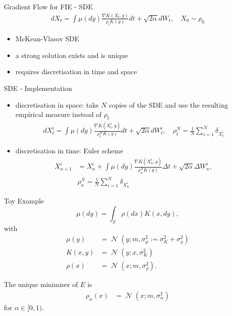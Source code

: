 \documentclass[aspectratio=149]{beamer}
\newcommand{\X}{\ensuremath{\mathbb{X}}}
\DeclareMathOperator{\N}{\mathcal{N}}
\begin{document}
\begin{frame}{Gradient Flow for FIE - SDE}
\begin{align*}
dX_{t}=\int\mu\left(dy\right)\frac{\nabla K(X_{t},y)}{\rho_{t}K(y)}dt+\sqrt{2\alpha}dW_{t},\quad X_{0}\sim\rho_{0}
\end{align*}

\begin{itemize}
\item McKean-Vlasov SDE
\item a strong solution exists and is unique
\item requires discretisation in time and space
\end{itemize}
\end{frame}

\begin{frame}{SDE - Implementation}
\begin{itemize}
\item discretisation in space: take $N$ copies of the SDE and use the resulting empirical measure instead of $\rho_t$
\begin{align*}
dX_{t}^{i}=\int\mu\left(dy\right)\frac{\nabla K(X_{t}^{i},y)}{\rho_{t}^{N}K(y)}dt+\sqrt{2\alpha}dW_{t}^{i},\quad\rho_{t}^{N}=\frac{1}{N}\sum_{i=1}^{N}\delta_{X_{t}^{i}}
\end{align*}
\item discretisation in time: Euler scheme
\begin{align*}
X_{n+1}^{i}& =X_{n}^{i}+\int\mu\left(dy\right)\frac{\nabla K(X_{n}^{i},y)}{\rho_{n}^{N}K(y)}\Delta t+\sqrt{2\alpha}\Delta W^{i}_n,\\
&\rho_{n}^{N}=\frac{1}{N}\sum_{i=1}^{N}\delta_{X_{n}^{i}}
\end{align*}
\end{itemize}
\end{frame}

\begin{frame}{Toy Example}
\begin{equation*}
\mu(dy) = \int_{\X} \rho(dx) K(x, dy), 
\end{equation*}
with 
\begin{align*}
\mu(y)&=\N(y;m,\sigma_{\mu}^{2}:=\sigma_{K}^{2}+\sigma_{\rho}^{2})\\
K(x,y)&=\N(y;x,\sigma_{K}^{2})\\
\rho(x)&=\N(x;m,\sigma_{\rho}^{2}).
\end{align*}

The unique minimiser of $E$ is
\begin{align*}
\rho_\alpha(x)&=\N(x;m,\sigma_{\alpha}^{2})
\end{align*}
for $\alpha\in[0, 1)$.
\end{frame}
\end{document}
